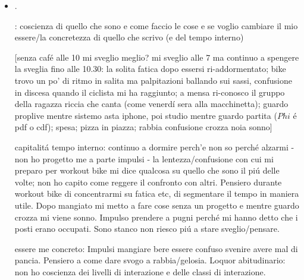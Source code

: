 \begin{itemize}
capitalit\'a tempo interno: : lentezza, quasi dolore nelle interazioni, azioni impacciate che continuano dopo essere uscito da sacco a pelo; : senza piacere, quasi pedalare senza motivo; reazione post workout bike: sonnolenza, incertezza/distrazione, : secondo caf\'e, mi sento male (debolezza quasi svenire), all'aperto sto meglio; birra, mensa chiusa, pizza in piazza: rabbia, frustrazione ma incapacit\'a di elaborare un progetto

essere me concreto: il motivo per svegliarsi, non sono coscienza capitalit\'a della concretezza - ; Incertezza relazione scilla, obiettivo disp fotonici. : secondo caf\'e. Assenza di obiettivi da finalizzare.

\item {}.

: coscienza di quello che sono e come faccio le cose e se voglio cambiare il mio essere/la concretezza di quello che scrivo (e del tempo interno)

[senza caf\'e alle 10 mi sveglio meglio? mi sveglio alle 7 ma continuo a spengere la sveglia fino alle 10.30: la solita fatica dopo essersi ri-addormentato; bike trovo un po' di ritmo in salita ma palpitazioni ballando sui sassi, confusione in discesa quando il ciclista mi ha raggiunto; a mensa ri-conosco il gruppo della ragazza riccia che canta (come venerd\'i sera alla macchinetta); guardo proplive mentre sistemo asta iphone, poi studio mentre guardo partita ($Phi$ \'e pdf o cdf); spesa; pizza in piazza; rabbia confusione crozza noia sonno]

capitalit\'a tempo interno: continuo a dormire perch'e non so perch\'e alzarmi - non ho progetto me a parte impulsi - la lentezza/confusione con cui mi preparo per workout bike mi dice qualcosa su quello che sono il pi\'u delle volte; non ho capito come reggere il confronto con altri. Pensiero durante workout bike di concentrarmi su fatica etc, di segmentare il tempo in maniera utile. Dopo mangiato mi metto a fare cose senza un progetto e mentre guardo crozza mi viene sonno. Impulso prendere a pugni perch\'e mi hanno detto che i posti erano occupati. Sono stanco non riesco pi\'u a stare sveglio/pensare.

essere me concreto: Impulsi mangiare bere essere confuso svenire avere mal di pancia. Pensiero a come dare svogo a rabbia/gelosia. Loquor abitudinario: non ho coscienza dei livelli di interazione e delle classi di interazione.


\end{itemize}
